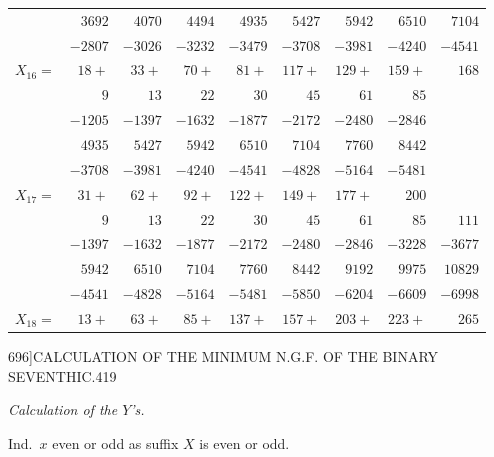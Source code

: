 \documentclass[11pt]{article}
\begin{document}
\begin{center}
\begin{tabular}{l|rrrrrrrr}
            & $3692$  & $4070$  & $4494$  & $4935$  & $5427$  & $5942$    & $6510$    & $7104$\\
            & $-2807$ & $-3026$ & $-3232$ & $-3479$ & $-3708$ & $-3981$   & $-4240$   & $-4541$\\
$X_{16}=$   & $18+$   & $33+$   & $70+$   & $81+$   & $117+$  & $129+$    & $159+$    & $168$ \\\hline
            & $9$     & $13$    & $22$    & $30$    & $45$    & $61$      & $85$      &       \\
            & $-1205$ & $-1397$ & $-1632$ & $-1877$ & $-2172$ & $-2480$   & $-2846$   &       \\
            & $4935$  & $5427$  & $5942$  & $6510$  & $7104$  & $7760$    & $8442$    &       \\
            & $-3708$ & $-3981$ & $-4240$ & $-4541$ & $-4828$ & $-5164$   & $-5481$   &       \\
$X_{17}=$   & $31+$   & $62+$   & $92+$   & $122+$  & $149+$  & $177+$    & $200$     &       \\\hline
            & $9$     & $13$    & $22$    & $30$    & $45$    & $61$      & $85$      & $111$ \\
            & $-1397$ & $-1632$ & $-1877$ & $-2172$ & $-2480$ & $-2846$   & $-3228$   & $-3677$\\
            & $5942$  & $6510$  & $7104$  & $7760$  & $8442$  & $9192$    & $9975$    & $10829$\\
            & $-4541$ & $-4828$ & $-5164$ & $-5481$ & $-5850$ & $-6204$   & $-6609$   & $-6998$\\
$X_{18}=$   & $13+$   & $63+$   & $85+$   & $137+$  & $157+$  & $203+$    & $223+$    & $265$ \\
\end{tabular}
\end{center}

\clearpage
\begin{center}\small 696]\hfill CALCULATION OF THE MINIMUM N.G.F. OF THE BINARY SEVENTHIC.\hfill 419\end{center}

\begin{center}\textit{Calculation of the $Y$'s.}\end{center}

\noindent Ind.~$x$ even or odd as suffix $X$ is even or odd.
\end{document}

